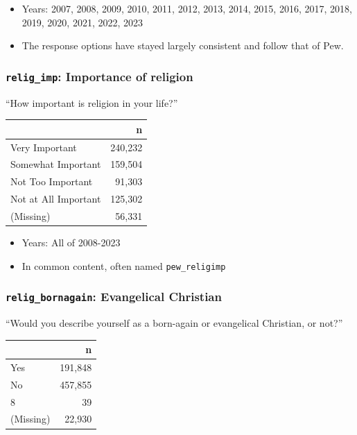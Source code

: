 \documentclass[10pt,article,oneside]{memoir}
\theoremstyle{definition}
\begin{document}
\begin{itemize}
\tightlist
\item
  Years: 2007, 2008, 2009, 2010, 2011, 2012, 2013, 2014, 2015, 2016,
  2017, 2018, 2019, 2020, 2021, 2022, 2023
\item
  The response options have stayed largely consistent and follow that of
  Pew.
\end{itemize}

\subsubsection{\texorpdfstring{\texttt{relig\_imp}: Importance of
religion}{relig\_imp: Importance of religion}}\label{relig_imp-importance-of-religion}

``How important is religion in your life?''

\begin{table}[H]
\centering
\begin{tabular}[t]{lr}
\toprule
 & n\\
\midrule
Very Important & 240,232\\
Somewhat Important & 159,504\\
Not Too Important & 91,303\\
Not at All Important & 125,302\\
(Missing) & 56,331\\
\bottomrule
\end{tabular}
\end{table}

\begin{itemize}
\tightlist
\item
  Years: All of 2008-2023
\item
  In common content, often named \texttt{pew\_religimp}
\end{itemize}

\subsubsection{\texorpdfstring{\texttt{relig\_bornagain}: Evangelical
Christian}{relig\_bornagain: Evangelical Christian}}\label{relig_bornagain-evangelical-christian}

``Would you describe yourself as a born-again or evangelical Christian,
or not?''

\begin{table}[H]
\centering
\begin{tabular}[t]{lr}
\toprule
 & n\\
\midrule
Yes & 191,848\\
No & 457,855\\
8 & 39\\
(Missing) & 22,930\\
\bottomrule
\end{tabular}
\end{table}
\end{document}
